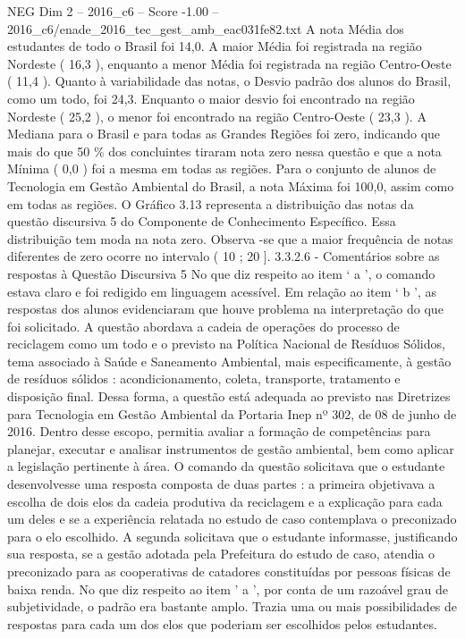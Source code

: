 \begin{textsample}{NEG Dim 2 – 2016\_c6 – Score -1.00 – 2016\_c6/enade\_2016\_tec\_gest\_amb\_eac031fe82.txt}
A nota Média dos estudantes de todo o Brasil foi 14,0.
A maior Média foi registrada na região Nordeste ( 16,3 ), enquanto a menor Média foi registrada na região Centro-Oeste ( 11,4 ).
Quanto à variabilidade das notas, o Desvio padrão dos alunos do Brasil, como um todo, foi 24,3.
Enquanto o maior desvio foi encontrado na região Nordeste ( 25,2 ), o menor foi encontrado na região Centro-Oeste ( 23,3 ).
A Mediana para o Brasil e para todas as Grandes Regiões foi zero, indicando que mais do que 50 \% dos concluintes tiraram nota zero nessa questão e que a nota Mínima ( 0,0 ) foi a mesma em todas as regiões.
Para o conjunto de alunos de Tecnologia em Gestão Ambiental do Brasil, a nota Máxima foi 100,0, assim como em todas as regiões.
O Gráfico 3.13 representa a distribuição das notas da questão discursiva 5 do Componente de Conhecimento Específico.
Essa distribuição tem moda na nota zero.
Observa -se que a maior frequência de notas diferentes de zero ocorre no intervalo ( 10 ; 20 ]. 3.3.2.6 - Comentários sobre as respostas à Questão Discursiva 5 No que diz respeito ao item ‘ a ’, o comando estava claro e foi redigido em linguagem acessível.
Em relação ao item ‘ b ’, as respostas dos alunos evidenciaram que houve problema na interpretação do que foi solicitado.
A questão abordava a cadeia de operações do processo de reciclagem como um todo e o previsto na Política Nacional de Resíduos Sólidos, tema associado à Saúde e Saneamento Ambiental, mais especificamente, à gestão de resíduos sólidos : acondicionamento, coleta, transporte, tratamento e disposição final.
Dessa forma, a questão está adequada ao previsto nas Diretrizes para Tecnologia em Gestão Ambiental da Portaria Inep nº 302, de 08 de junho de 2016.
Dentro desse escopo, permitia avaliar a formação de competências para planejar, executar e analisar instrumentos de gestão ambiental, bem como aplicar a legislação pertinente à área.
O comando da questão solicitava que o estudante desenvolvesse uma resposta composta de duas partes : a primeira objetivava a escolha de dois elos da cadeia produtiva da reciclagem e a explicação para cada um deles e se a experiência relatada no estudo de caso contemplava o preconizado para o elo escolhido.
A segunda solicitava que o estudante informasse, justificando sua resposta, se a gestão adotada pela Prefeitura do estudo de caso, atendia o preconizado para as cooperativas de catadores constituídas por pessoas físicas de baixa renda.
No que diz respeito ao item ’ a ’, por conta de um razoável grau de subjetividade, o padrão era bastante amplo.
Trazia uma ou mais possibilidades de respostas para cada um dos elos que poderiam ser escolhidos pelos estudantes.

\end{textsample}
